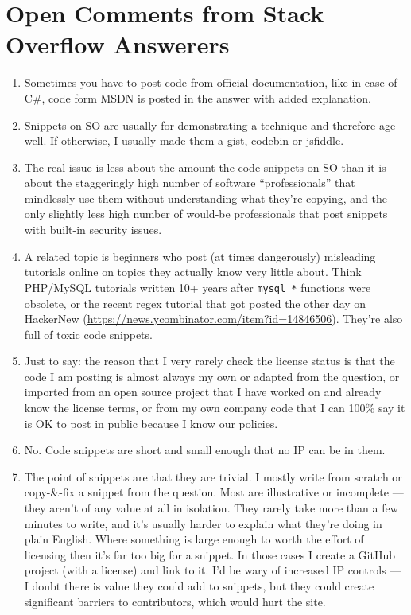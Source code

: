 \documentclass{svjour3}                     %
\begin{document}
\section{Open Comments from Stack Overflow Answerers}\label{appendixC}

\begin{enumerate}
	\itemsep1em
	\item Sometimes you have to post code from official documentation, like in case of C\#, code form MSDN is posted in the answer with added explanation.
	\item Snippets on SO are usually for demonstrating a technique and therefore age well. If otherwise, I usually made them a gist, codebin or jsfiddle.
	\item The real issue is less about the amount the code snippets on SO than it is about the staggeringly high number of software ``professionals'' that mindlessly use them without understanding what they're copying, and the only slightly less high number of would-be professionals that post snippets with built-in security issues.
	\item A related topic is beginners who post (at times dangerously) misleading tutorials online on topics they actually know very little about. Think PHP/MySQL tutorials written 10+ years after \texttt{mysql\_*} functions were obsolete, or the recent regex tutorial that got posted the other day on HackerNew (\url{https://news.ycombinator.com/item?id=14846506}). They're also full of toxic code snippets.
	\item Just to say: the reason that I very rarely check the license status is that the code I am posting is almost always my own or adapted from the question, or imported from an open source project that I have worked on and already know the license terms, or from my own company code that I can 100\% say it is OK to post in public because I know our policies.
	\item No. Code snippets are short and small enough that no IP can be in them.
	\item The point of snippets are that they are trivial. I mostly write from scratch or copy-\&-fix a snippet from the question. Most are illustrative or incomplete --- they aren't of any value at all in isolation. They rarely take more than a few minutes to write, and it's usually harder to explain what they're doing in plain English. Where something is large enough to worth the effort of licensing then it's far too big for a snippet. In those cases I create a GitHub project (with a license) and link to it. I'd be wary of increased IP controls --- I doubt there is value they could add to snippets, but they could create significant barriers to contributors, which would hurt the site.

\end{enumerate}
\end{document}

